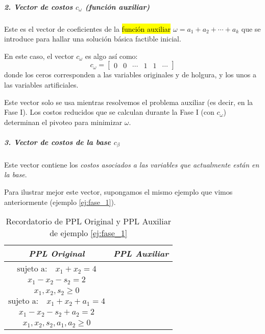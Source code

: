 \subparagraph{2. Vector de costos \(c_\omega\) (función auxiliar)}

Este es el vector de coeficientes de la \hl{función auxiliar} \(\omega = a_1 + a_2 + \cdots + a_k\) que se introduce para hallar una solución básica factible inicial.

En este caso, el vector \(c_\omega\) es algo así como:
\[
  c_\omega = \begin{bmatrix} 0 & 0 & \cdots & 1 & 1 & \cdots \end{bmatrix}
\]
donde los ceros corresponden a las variables originales y de holgura, y los unos a las variables artificiales.

Este vector solo se usa mientras resolvemos el problema auxiliar (es decir, en la Fase I). Los costos reducidos que se calculan durante la Fase I (con \(c_\omega\)) determinan el pivoteo para minimizar \(\omega\).

\vspace{5mm}

\subparagraph{3. Vector de costos de la base \(c_\beta\)}

Este vector contiene los \textit{costos asociados a las variables que actualmente están en la base}.

Para ilustrar mejor este vector, supongamos el mismo ejemplo que vimos anteriormente (ejemplo \ref{ej:fase_1}).

\begin{table}[htbp]
  \centering
  \renewcommand\cellalign{tl}
  \renewcommand\cellgape{\Gape[4pt]}
  \begin{tabular}{c|c}
  \textit{PPL Original} & \textit{PPL Auxiliar} \\
  \hline
  \makecell[l]{
    \(\text{maximizar} \quad z = 3x_1 + 2x_2\)\\[3pt]
    \(\text{sujeto a:} \quad x_1 + x_2 = 4\)\\
    \hspace{4.5em}\(x_1 - x_2 - s_2 = 2\)\\
    \hspace{4.5em}\(x_1, x_2, s_2 \geq 0\)
  }
  &
  \makecell[l]{
    \(\text{maximizar} \quad -\omega = -a_1 - a_2\)\\[3pt]
    \(\text{sujeto a:} \quad x_1 + x_2 + a_1 = 4\)\\
    \hspace{4.5em}\(x_1 - x_2 - s_2 + a_2 = 2\)\\
    \hspace{4.5em}\(x_1, x_2, s_2, a_1, a_2 \geq 0\)
  }
  \\
  \end{tabular}
  \caption{Recordatorio de PPL Original y PPL Auxiliar de ejemplo \ref{ej:fase_1}}
  \label{tab:comparacion_ppl}
\end{table}

